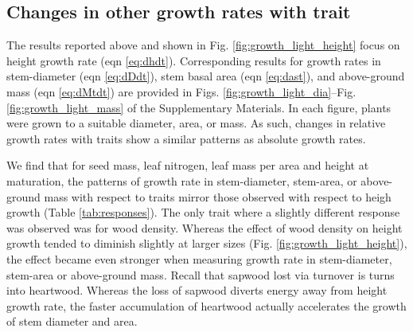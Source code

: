 \documentclass[a4paper,11pt]{article}
\begin{document}

\subsection{Changes in other growth rates with trait}

The results reported above and shown in Fig. \ref{fig:growth_light_height} focus on height growth rate (eqn \ref{eq:dhdt}). Corresponding results for growth rates in stem-diameter (eqn \ref{eq:dDdt}), stem basal area (eqn \ref{eq:dast}), and above-ground mass (eqn \ref{eq:dMtdt}) are provided in Figs. \ref{fig:growth_light_dia}--Fig. \ref{fig:growth_light_mass} of the Supplementary Materials. In each figure, plants were grown to a suitable diameter, area, or mass. As such, changes in relative growth rates with traits show a similar patterns as absolute growth rates.

We find that for seed mass, leaf nitrogen, leaf mass per area and height at maturation, the patterns of growth rate in stem-diameter, stem-area, or above-ground mass with respect to traits mirror those observed with respect to heigh growth (Table \ref{tab:responses}). The only trait where a slightly different response was observed was for wood density. Whereas the effect of wood density on height growth tended to diminish slightly at larger sizes (Fig. \ref{fig:growth_light_height}), the effect became even stronger when measuring growth rate in stem-diameter, stem-area or above-ground mass. Recall that sapwood lost via turnover is turns into heartwood. Whereas the loss of sapwood diverts energy away from height growth rate, the faster accumulation of heartwood actually accelerates the growth of stem diameter and area.
\end{document}
